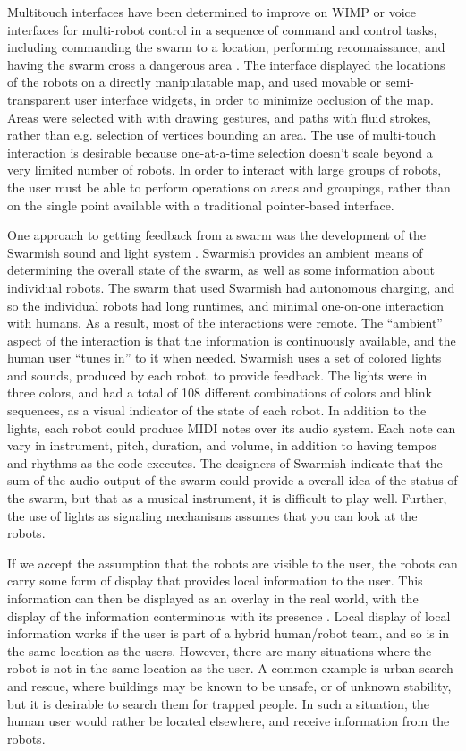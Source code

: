 \documentclass[]{article}
\begin{document}
Multitouch interfaces have been determined to improve on WIMP or voice interfaces for multi-robot control in a sequence of command and control tasks, including commanding the swarm to a location, performing reconnaissance, and having the swarm cross a dangerous area \cite{hayes2010multi}.
The interface displayed the locations of the robots on a directly manipulatable map, and used movable or semi-transparent user interface widgets, in order to minimize occlusion of the map. 
Areas were selected with with drawing gestures, and paths with fluid strokes, rather than e.g. selection of vertices bounding an area.
The use of multi-touch interaction is desirable because one-at-a-time selection doesn't scale beyond a very limited number of robots.
In order to interact with large groups of robots, the user must be able to perform operations on areas and groupings, rather than on the single point available with a traditional pointer-based interface. 

One approach to getting feedback from a swarm was the development of the Swarmish sound and light system \cite{mclurkin2006speaking}. 
Swarmish provides an ambient means of determining the overall state of the swarm, as well as some information about individual robots. 
The swarm that used Swarmish had autonomous charging, and so the individual robots had long runtimes, and minimal one-on-one interaction with humans. 
As a result, most of the interactions were remote.
The ``ambient'' aspect of the interaction is that the information is continuously available, and the human user ``tunes in'' to it when needed. 
Swarmish uses a set of colored lights and sounds, produced by each robot, to provide feedback. 
The lights were in three colors, and had a total of 108 different combinations of colors and blink sequences, as a visual indicator of the state of each robot. 
In addition to the lights, each robot could produce MIDI notes over its audio system. 
Each note can vary in instrument, pitch, duration, and volume, in addition to having tempos and rhythms as the code executes. 
The designers of Swarmish indicate that the sum of the audio output of the swarm could provide a overall idea of the status of the swarm, but that as a musical instrument, it is difficult to play well. 
Further, the use of lights as signaling mechanisms assumes that you can look at the robots. 

If we accept the assumption that the robots are visible to the user, the robots can carry some form of display that provides local information to the user. 
This information can then be displayed as an overlay in the real world, with the display of the information conterminous with its presence \cite{Daily:2003:WEI:820752.821587}. 
Local display of local information works if the user is part of a hybrid human/robot team, and so is in the same location as the users. 
However, there are many situations where the robot is not in the same location as the user. 
A common example is urban search and rescue, where buildings may be known to be unsafe, or of unknown stability, but it is desirable to search them for trapped people. 
In such a situation, the human user would rather be located elsewhere, and receive information from the robots. 
\end{document}
